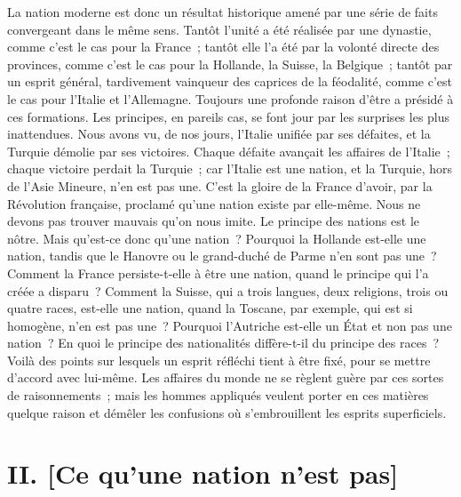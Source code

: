 \documentclass[twoside]{book} %
\newcommand\orgName[1]{#1}
\newcommand\placeName[1]{#1}
\newcommand\chapteropen{} %
\newcommand\chapterclose{} %
\begin{document}
La nation moderne est donc un résultat historique amené par une série de faits convergeant dans le même sens. Tantôt l’unité a été réalisée par une dynastie, comme c’est le cas pour la {\placeName France} ; tantôt elle l’a été par la volonté directe des provinces, comme c’est le cas pour la {\placeName Hollande}, la {\placeName Suisse}, la {\placeName Belgique} ; tantôt par un esprit général, tardivement vainqueur des caprices de la féodalité, comme c’est le cas pour l’{\placeName Italie} et l’{\placeName Allemagne}. Toujours une profonde raison d’être a présidé à ces formations. Les principes, en pareils cas, se font jour par les surprises les plus inattendues. Nous avons vu, de nos jours, l’{\orgName Italie} unifiée par ses défaites, et la {\orgName Turquie} démolie par ses victoires. Chaque défaite avançait les affaires de l’{\orgName Italie} ; chaque victoire perdait la {\orgName Turquie} ; car l’{\orgName Italie} est une nation, et la {\orgName Turquie}, hors de l’{\placeName Asie Mineure}, n’en est pas une. C’est la gloire de la {\orgName France} d’avoir, par la Révolution française, proclamé qu’une nation existe par elle-même. Nous ne devons pas trouver mauvais qu’on nous imite. Le principe des nations est le nôtre. Mais qu’est-ce donc qu’une nation ? Pourquoi la {\placeName Hollande} est-elle une nation, tandis que le {\placeName Hanovre} ou le {\placeName grand-duché de Parme} n’en sont pas une ? Comment la {\placeName France} persiste-t-elle à être une nation, quand le principe qui l’a créée a disparu ? Comment la {\placeName Suisse}, qui a trois langues, deux religions, trois ou quatre races, est-elle une nation, quand la {\placeName Toscane}, par exemple, qui est si homogène, n’en est pas une ? Pourquoi l’{\placeName Autriche} est-elle un État et non pas une nation ? En quoi le principe des nationalités diffère-t-il du principe des races ? Voilà des points sur lesquels un esprit réfléchi tient à être fixé, pour se mettre d’accord avec lui-même. Les affaires du monde ne se règlent guère par ces sortes de raisonnements ; mais les hommes appliqués veulent porter en ces matières quelque raison et démêler les confusions où s’embrouillent les esprits superficiels.
\chapterclose


\chapteropen

\chapter[{II. [Ce qu’une nation n’est pas]}]{II. [Ce qu’une nation n’est pas]}
\renewcommand{\leftmark}{II. [Ce qu’une nation n’est pas]}
\end{document}
